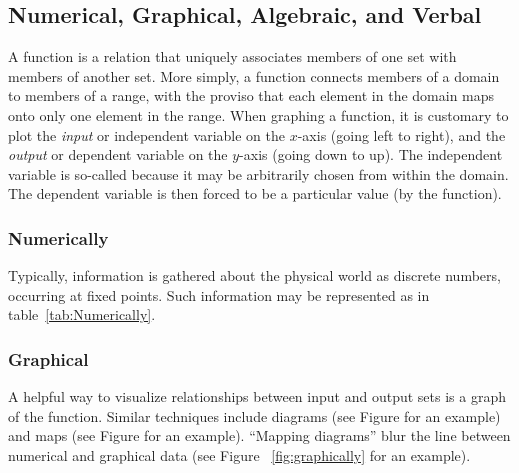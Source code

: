 
\subsection{Numerical, Graphical, Algebraic, and Verbal}





A \gls{function} is a relation that uniquely associates members of one \gls{set} 
with members of another set.  
More simply, a function connects members of a \gls{domain} to members of a \gls{range}, 
with the proviso that each element in the domain maps onto only one element in the range.  
When graphing a function, it is customary to plot the \emph{input} or \gls{independent variable} 
on the $x$-axis (going left to right), and the \emph{output} or \gls{dependent variable} on 
the $y$-axis (going down to up).  The independent variable is so-called because it may 
be arbitrarily chosen from within the domain.  The dependent 
variable is then forced to be a particular value (by the function).

\subsubsection{Numerically}
Typically, information is gathered about the physical world as \gls{discrete} numbers, 
occurring at fixed points. Such information may be represented as in table~\ref{tab:Numerically}.

    
    
\subsubsection{Graphical}
A helpful way to visualize relationships between input and output 
sets is a \gls{graph} of the function.  Similar techniques
include diagrams (see Figure for an example) and maps (see Figure for an example).  
``Mapping diagrams'' blur the line between numerical and graphical data 
(see Figure ~\ref{fig:graphically} for an example).


